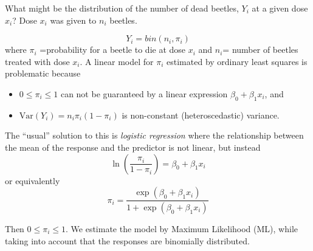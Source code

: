 \documentclass[
  ignorenonframetext,
]{beamer}
\begin{document}
\begin{frame}
What might be the distribution of the number of dead beetles, \(Y_i\) at
a given dose \(x_i\)? Dose \(x_i\) was given to \(n_i\) beetles.
\end{frame}

\begin{frame}
\[ Y_i=bin(n_i,\pi_i)\] where \(\pi_i\) =probability for a beetle to die
at dose \(x_i\) and \(n_i\)= number of beetles treated with dose
\(x_i\). A linear model for \(\pi_i\) estimated by ordinary least
squares is problematic because

\begin{itemize}
\item
  \(0 \le \pi_i \le 1\) can not be guaranteed by a linear expression
  \(\beta_0+\beta_1 x_i\), and
\item
  \(\text{Var}(Y_i) =n_i \pi_i (1-\pi_i)\) is non-constant
  (heteroscedastic) variance.
\end{itemize}
\end{frame}

\begin{frame}
The ``usual'' solution to this is \emph{logistic regression} where the
relationship between the mean of the response and the predictor is not
linear, but instead
\[ \ln(\frac{\pi_i}{1-\pi_i})= \beta_0+\beta_1 x_i \] or equivalently
\[\pi_i=\frac{\exp(\beta_0+\beta_1 x_i)}{1+\exp(\beta_0+\beta_1 x_i)}\]

Then \(0\le \pi_i\le 1\). We estimate the model by Maximum Likelihood
(ML), while taking into account that the responses are binomially
distributed.
\end{frame}
\end{document}

